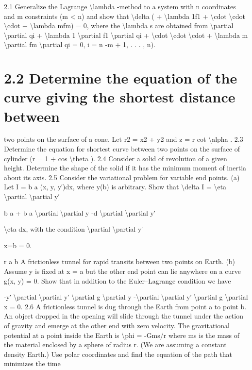 2.1 Generalize the Lagrange \textbackslash{}lambda -method to a system with n coordinates and m
constraints (m \textless{} n) and show that
\textbackslash{}delta ( + \textbackslash{}lambda 1f1 + \textbackslash{}cdot  \textbackslash{}cdot  \textbackslash{}cdot  + \textbackslash{}lambda mfm) = 0,
where the \textbackslash{}lambda s are obtained from
\textbackslash{}partial
\textbackslash{}partial qi
+ \textbackslash{}lambda 1
\textbackslash{}partial f1
\textbackslash{}partial qi
+ \textbackslash{}cdot  \textbackslash{}cdot  \textbackslash{}cdot  + \textbackslash{}lambda m
\textbackslash{}partial fm
\textbackslash{}partial qi
= 0,
i = n -m + 1, . . . , n).
\section*{2.2  Determine the equation of the curve giving the shortest distance between}

two points on the surface of a cone. Let r2 = x2 + y2 and z = r cot \textbackslash{}alpha .
2.3 Determine the equation for shortest curve between two points on the surface of cylinder (r = 1 + cos \textbackslash{}theta ).
2.4 Consider a solid of revolution of a given height. Determine the shape of
the solid if it has the minimum moment of inertia about its axis.
2.5 Consider the variational problem for variable end points. (a) Let
I =
b
a
(x, y, y′)dx,
where y(b) is arbitrary. Show that
\textbackslash{}delta I = \textbackslash{}eta  \textbackslash{}partial
\textbackslash{}partial y′

b
a
+
b
a
\textbackslash{}partial
\textbackslash{}partial y -d
\textbackslash{}partial
\textbackslash{}partial y′

\textbackslash{}eta dx,
with the condition
\textbackslash{}partial
\textbackslash{}partial y′

x=b
= 0.

r
a
b
A frictionless tunnel for rapid transits between two points on Earth.
(b) Assume y is fixed at x = a but the other end point can lie anywhere
on a curve g(x, y) = 0. Show that in addition to the Euler--Lagrange
condition we have

-y′ \textbackslash{}partial
\textbackslash{}partial y′
\textbackslash{}partial g
\textbackslash{}partial y -\textbackslash{}partial
\textbackslash{}partial y′
\textbackslash{}partial g
\textbackslash{}partial x = 0.
2.6 A frictionless tunnel is dug through the Earth from point a to point b.
An object dropped in the opening will slide through the tunnel under
the action of gravity and emerge at the other end with zero velocity.
The gravitational potential at a point inside the Earth is \textbackslash{}phi  = -Gms/r
where ms is the mass of the material enclosed by a sphere of radius r.
(We are assuming a constant density Earth.) Use polar coordinates and
find the equation of the path that minimizes the time


